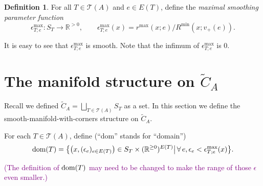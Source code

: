 \documentclass[11pt]{article}
\theoremstyle{definition}
\newtheorem{dfn}[thm]{Definition}
\theoremstyle{remark}
\def\wt#1{\widetilde{#1}}
\def\R{\mathbb{R}}
\def\cT{\mathcal{T}}
\def\dom{{\tn{dom}}}
\def\cmt#1{\textcolor{purple}{(#1)}}
\def\tn#1{\textnormal{#1}}
\begin{document}
\begin{dfn}
For all $T\in\cT(A)$ and $e\in E(T)$, define the {\it maximal smoothing parameter function}
$$\epsilon^{\max}_{T;e}:S_T\longrightarrow \R^{>0},\qquad \epsilon^{\max}_{T;e}(x)=r^{\max}(x;e)\big/R^{\min}(x;v_+(e)).$$
\end{dfn}
It is easy to see that $\epsilon^{\max}_{T;e}$ is smooth. Note that the infimum of $\epsilon^{\max}_{T;e}$ is 0. 





\section{The manifold structure on \texorpdfstring{$\wt{C}_A$}{the big configuration space}}
\label{conftilde_sec}

Recall we defined $\wt{C}_A=\bigsqcup_{T\in\cT(A)}S_T$ as a set. 
In this section we define the smooth-manifold-with-corners structure on $\wt{C}_A$. 


For each $T\in\cT(A)$, define (``dom'' stands for ``domain'')
$$\dom(T)=\big\{\big(x,(\epsilon_e)_{e\in E(T)}\big)\in S_T\times(\R^{\ge0})^{E(T)}\big|\,\forall\,e, \epsilon_e<\epsilon^{\max}_{T;e}(x)\big\}.$$

\cmt{The definition of $\dom(T)$ may need to be changed to make the range of those $\epsilon$ even smaller.}
\end{document}
